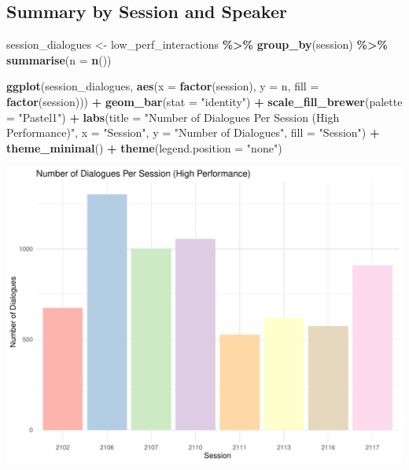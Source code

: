 \documentclass[
]{article}
\newenvironment{Shaded}{\begin{snugshade}}{\end{snugshade}}
\newcommand{\AttributeTok}[1]{\textcolor[rgb]{0.13,0.29,0.53}{#1}}
\newcommand{\FunctionTok}[1]{\textcolor[rgb]{0.13,0.29,0.53}{\textbf{#1}}}
\newcommand{\NormalTok}[1]{#1}
\newcommand{\OtherTok}[1]{\textcolor[rgb]{0.56,0.35,0.01}{#1}}
\newcommand{\SpecialCharTok}[1]{\textcolor[rgb]{0.81,0.36,0.00}{\textbf{#1}}}
\newcommand{\StringTok}[1]{\textcolor[rgb]{0.31,0.60,0.02}{#1}}
\begin{document}
\hypertarget{summary-by-session-and-speaker}{%
\subsection{Summary by Session and
Speaker}\label{summary-by-session-and-speaker}}

\begin{Shaded}
\begin{Highlighting}[]
\NormalTok{session\_dialogues }\OtherTok{\textless{}{-}}\NormalTok{ low\_perf\_interactions }\SpecialCharTok{\%\textgreater{}\%}
  \FunctionTok{group\_by}\NormalTok{(session) }\SpecialCharTok{\%\textgreater{}\%}
  \FunctionTok{summarise}\NormalTok{(}\AttributeTok{n =} \FunctionTok{n}\NormalTok{())}


\FunctionTok{ggplot}\NormalTok{(session\_dialogues, }\FunctionTok{aes}\NormalTok{(}\AttributeTok{x =} \FunctionTok{factor}\NormalTok{(session), }\AttributeTok{y =}\NormalTok{ n, }\AttributeTok{fill =} \FunctionTok{factor}\NormalTok{(session))) }\SpecialCharTok{+} 
  \FunctionTok{geom\_bar}\NormalTok{(}\AttributeTok{stat =} \StringTok{"identity"}\NormalTok{) }\SpecialCharTok{+}
  \FunctionTok{scale\_fill\_brewer}\NormalTok{(}\AttributeTok{palette =} \StringTok{"Pastel1"}\NormalTok{) }\SpecialCharTok{+}  
  \FunctionTok{labs}\NormalTok{(}\AttributeTok{title =} \StringTok{"Number of Dialogues Per Session (High Performance)"}\NormalTok{,}
       \AttributeTok{x =} \StringTok{"Session"}\NormalTok{,}
       \AttributeTok{y =} \StringTok{"Number of Dialogues"}\NormalTok{,}
       \AttributeTok{fill =} \StringTok{"Session"}\NormalTok{) }\SpecialCharTok{+}
  \FunctionTok{theme\_minimal}\NormalTok{() }\SpecialCharTok{+} 
  \FunctionTok{theme}\NormalTok{(}\AttributeTok{legend.position =} \StringTok{"none"}\NormalTok{) }
\end{Highlighting}
\end{Shaded}

\begin{center}\includegraphics{low_surv_analysis_files/figure-latex/unnamed-chunk-2-1} \end{center}
\end{document}
